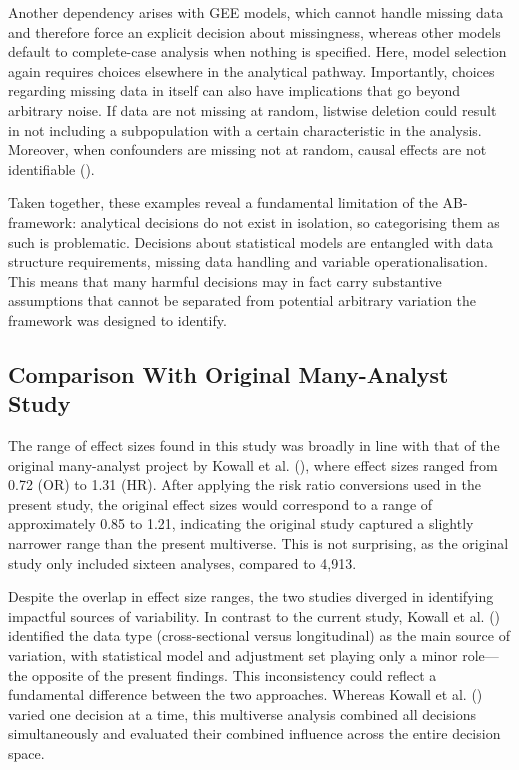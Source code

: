 \documentclass[
  man,
  floatsintext,
  longtable,
  nolmodern,
  notxfonts,
  notimes,
  colorlinks=true,linkcolor=blue,citecolor=blue,urlcolor=blue]{apa7}
\begin{document}
Another dependency arises with GEE models, which cannot handle missing
data and therefore force an explicit decision about missingness, whereas
other models default to complete-case analysis when nothing is
specified. Here, model selection again requires choices elsewhere in the
analytical pathway. Importantly, choices regarding missing data in
itself can also have implications that go beyond arbitrary noise. If
data are not missing at random, listwise deletion could result in not
including a subpopulation with a certain characteristic in the analysis.
Moreover, when confounders are missing not at random, causal effects are
not identifiable ().

Taken together, these examples reveal a fundamental limitation of the
AB-framework: analytical decisions do not exist in isolation, so
categorising them as such is problematic. Decisions about statistical
models are entangled with data structure requirements, missing data
handling and variable operationalisation. This means that many harmful
decisions may in fact carry substantive assumptions that cannot be
separated from potential arbitrary variation the framework was designed
to identify.

\subsection{Comparison With Original Many-Analyst
Study}\label{comparison-with-original-many-analyst-study}

The range of effect sizes found in this study was broadly in line with
that of the original many-analyst project by Kowall et al.
(), where effect sizes ranged
from 0.72 (OR) to 1.31 (HR). After applying the risk ratio conversions
used in the present study, the original effect sizes would correspond to
a range of approximately 0.85 to 1.21, indicating the original study
captured a slightly narrower range than the present multiverse. This is
not surprising, as the original study only included sixteen analyses,
compared to 4,913.

Despite the overlap in effect size ranges, the two studies diverged in
identifying impactful sources of variability. In contrast to the current
study, Kowall et al. ()
identified the data type (cross-sectional versus longitudinal) as the
main source of variation, with statistical model and adjustment set
playing only a minor role---the opposite of the present findings. This
inconsistency could reflect a fundamental difference between the two
approaches. Whereas Kowall et al.
() varied one decision at a
time, this multiverse analysis combined all decisions simultaneously and
evaluated their combined influence across the entire decision space.
\end{document}
